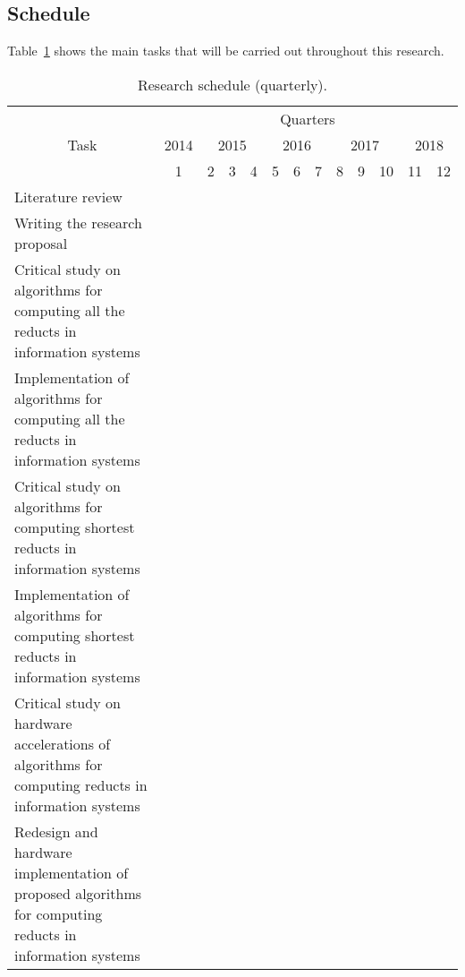 \documentclass[authoryear,11pt]{elsarticle}
\begin{document}
\subsection{Schedule}
  Table~\ref{tab_Schedule} shows the main tasks that will be carried out throughout this research.
 \begin{table}[h!]
		\caption{Research schedule (quarterly\protect\footnotemark).} \label{tab_Schedule}
		\centering
 	\begin{tabular}{|p{8cm}|c|c|c|c|c|c|c|c|c|c|c|c|}
 		\hline
		\multicolumn{1}{|c|}{\multirow{3}{*}{Task}} & \multicolumn{12}{c|}{Quarters}\\
 		\cline{2-13}
		 & 2014 & \multicolumn{3}{c|}{2015} & \multicolumn{3}{c|}{2016} & \multicolumn{3}{c|}{2017}
		 & \multicolumn{2}{c|}{2018} \\
 		\cline{2-13}
		 & 1 & 2 & 3 & 4 & 5 & 6 & 7 & 8 & 9 & 10 & 11 & 12 \\
		\hline
		Literature review &\cellcolor{blue}&\cellcolor{blue}&\cellcolor{blue}&
		\cellcolor[gray]{0.9}&\cellcolor[gray]{0.9}&\cellcolor[gray]{0.9}&\cellcolor[gray]{0.9}&
		\cellcolor[gray]{0.9}&\cellcolor[gray]{0.9}&\cellcolor[gray]{0.9}&\cellcolor[gray]{0.9}&
		\cellcolor[gray]{0.9}\\
		\hline
		Writing the research proposal &\cellcolor{blue}&\cellcolor{blue}&\cellcolor{blue}&&&&&&&&&\\
		\hline
		Critical study on algorithms for computing all the reducts in information systems
		&\cellcolor{blue}&\cellcolor{blue}&\cellcolor{blue}&&&&&&&&&\\
		\hline
		Implementation of algorithms for computing all the reducts in information systems
		&&\cellcolor{blue}&\cellcolor{blue}&&&&&&&&&\\
		\hline
		Critical study on algorithms for computing shortest reducts in information systems
		&&&&\cellcolor[gray]{0.9}&\cellcolor[gray]{0.9}&\cellcolor[gray]{0.9}&&&&&&\\
		\hline
		Implementation of algorithms for computing shortest reducts in information systems
		&&&&&\cellcolor[gray]{0.9}&\cellcolor[gray]{0.9}&&&&&&\\
		\hline
		Critical study on hardware accelerations of algorithms for computing reducts in information systems
		&&&&&&&\cellcolor[gray]{0.9}&\cellcolor[gray]{0.9}&\cellcolor[gray]{0.9}&&&\\
		\hline
		Redesign and hardware implementation of proposed algorithms for computing reducts in information systems
		&&&&&&&&\cellcolor[gray]{0.9}&\cellcolor[gray]{0.9}&&&\\

\end{tabular}
\end{table}
\end{document}
